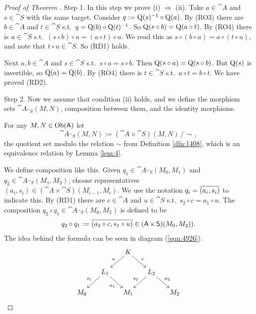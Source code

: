 \begin{proof}[Proof of Theorem \tup{\ref{thm:103}}] \mbox{}

\smallskip \noindent
Step 1. In this step we prove (i) $\Rightarrow$ (ii). 
Take $a \in \cat{A}$ and $s \in \cat{S}$ with the same target. 
Consider $q := \operatorname{Q}(s)^{-1} \circ \operatorname{Q}(a)$. By (RO3) there are 
$b \in \cat{A}$ and $t \in \cat{S}$ s.t.\ 
$q = \operatorname{Q}(b) \circ \operatorname{Q}(t)^{-1}$. 
So
$\operatorname{Q}(s \circ b) = \operatorname{Q}(a \circ t)$.
By (RO4) there is $u \in \cat{S}$ s.t.\ 
$(s \circ b) \circ u = (a \circ t) \circ u$.
We read this as 
$s \circ (b \circ u) = a \circ (t \circ u)$,
and note that $t \circ u \in \cat{S}$. So (RD1) holds.

Next $a, b \in \cat{A}$ and $s \in \cat{S}$ s.t.\ 
$s \circ a = s \circ b$.  Then 
$\operatorname{Q}(s \circ a) = \operatorname{Q}(s \circ b)$. But $\operatorname{Q}(s)$ is invertible, so 
$\operatorname{Q}(a) = \operatorname{Q}(b)$. By (RO4) there is $t \in \cat{S}$ s.t.\ 
$a \circ t = b \circ t$. We have proved (RD2). 


\medskip \noindent
Step 2. Now we assume that condition (ii) holds, and we define 
the morphism sets $\cat{A}_{\cat{S}}(M, N)$, composition between them, and the 
identity morphisms. 

For any $M, N \in \operatorname{Ob}(\operatorname{\mathsf{A}})$ let
\[ \cat{A}_{\cat{S}}(M, N) :=
(\cat{A} \times \cat{S})(M, N) \, / \, \sim , \]
the quotient set modulo the relation $\sim$ from 
Definition \ref{dfn:1408}, which is an
equivalence relation by Lemma \ref{lem:4}.

We define composition like this. Given 
$q_1 \in \cat{A}_{\cat{S}}(M_0, M_1)$
and 
$q_2 \in \cat{A}_{\cat{S}}(M_1, M_2)$,
choose representatives 
$(a_i, s_i) \in (\cat{A} \times \cat{S})(M_{i-1}, M_i)$.
We use the notation 
$q_i = \overline{ (a_i, s_i) }$ to indicate this. 
By (RD1) there are $c \in \cat{A}$ and $u \in \cat{S}$ s.t.\ 
$s_2 \circ c = a_1 \circ u$. 
The composition 
$q_2 \circ q_1 \in \cat{A}_{\cat{S}}(M_0, M_2)$
is defined to be
\[ q_2 \circ q_1 := \overline{ (a_2 \circ c, s_1 \circ u) } 
\in (\operatorname{\mathsf{A}} \times \operatorname{\mathsf{S}})(M_{0}, M_2)) . \]
The idea behind the formula can be seen in diagram (\ref{eqn:4926}). 
\begin{equation} \label{eqn:4926}
\UseTips  \xymatrix @C=3.5ex @R=3.5ex  {
& & 
K
\ar[dl]_{u}
\ar[dr]^{c}
\\
&
L_1
\ar[dl]_{s_1}
\ar[dr]_(0.5){a_1}
& & 
L_2
\ar[dl]_(0.5){s_2}
\ar[dr]^{a_2}
\\
M_0 
& &
M_1
& &
M_2
}
\end{equation}


\end{proof}
